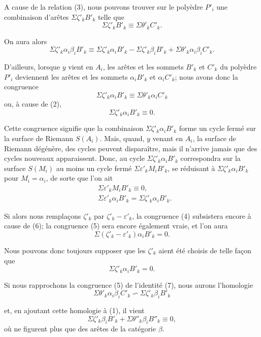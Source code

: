 \documentclass{article}
\begin{document}
A cause de la relation (3), nous pouvons trouver sur le polyèdre $P'_{i}$ une combinaison d'arêtes $\Sigma \zeta'_{k} B'_{k}$ telle que
\[ \Sigma \zeta'_{k} B'_{k} \equiv \Sigma \theta'_{k} C'_{k}. \tag{4} \]


On aura alors
\[ \Sigma \zeta'_{k} \alpha_{i}\beta_{i}B'_{k} \equiv \Sigma \zeta'_{k} \alpha_{i}B'_{k} - \Sigma \zeta'_{k} \beta_{i}B'_{k} + \Sigma \theta'_{k} \alpha_{i}\beta_{i}C'_{k}. \tag{5} \]

D'ailleurs, lorsque $y$ vient en $A_{i}$, les arêtes et les sommets $B'_{k}$ et $C'_{k}$ du polyèdre $P'_{i}$ deviennent les arêtes et les sommets $\alpha_{i}B'_{k}$ et $\alpha_{i}C'_{k}$; nous avons donc la congruence
\[ \Sigma \zeta'_{k} \alpha_{i}B'_{k} \equiv \Sigma \theta'_{k} \alpha_{i}C'_{k} \]
ou, à cause de (2),
\[ \Sigma \zeta'_{k} \alpha_{i}B'_{k} \equiv 0. \]

Cette congruence signifie que la combinaison $\Sigma \zeta'_{k} \alpha_{i}B'_{k}$ forme un cycle fermé sur la surface de Riemann $S(A_{i})$. Mais, quand, $y$ venant en $A_{i}$, la surface de Riemann dégénère, des cycles peuvent disparaître, mais il n'arrive jamais que des cycles nouveaux apparaissent. Donc, au cycle $\Sigma \zeta'_{k} \alpha_{i}B'_{k}$ correspondra sur la surface $S(M_{i})$ au moins un cycle fermé $\Sigma \varepsilon'_{k} M_{i}B'_{k}$, se réduisant à $\Sigma \zeta'_{k} \alpha_{i}B'_{k}$ pour $M_{i} = \alpha_{i}$, de sorte que l'on ait
\[ \begin{aligned} &\Sigma \varepsilon'_{k} M_{i}B'_{k} \equiv 0,\\ &\Sigma \varepsilon'_{k} \alpha_{i}B'_{k} = \Sigma \zeta'_{k} \alpha_{i}B'_{k}. \end{aligned} \tag{6} \]

Si alors nous remplaçons $\zeta'_{k}$ par $\zeta'_{k} - \varepsilon'_{k}$, la congruence (4) subsistera encore à cause de (6); la congruence (5) sera encore également vraie, et l'on aura
\[ \Sigma(\zeta'_{k} - \varepsilon'_{k})\alpha_{i}B'_{k} = 0. \]

Nous pouvons donc toujours supposer que les $\zeta'_{k}$ aient été choisis de telle façon que
\[ \Sigma \zeta'_{k} \alpha_{i}B'_{k} = 0. \tag{7} \]

Si nous rapprochons la congruence (5) de l'identité (7), nous aurons l'homologie
\[ \Sigma \theta'_{k} \alpha_{i}\beta_{i}C'_{k} \backsim \Sigma \zeta'_{k} \beta_{i}B'_{k} \tag{8} \]

et, en ajoutant cette homologie à (1), il vient
\[ \Sigma \zeta'_{k} \beta_{i}B'_{k} + \Sigma \theta''_{k} \beta_{i}B''_{k} \equiv 0, \]
où ne figurent plus que des arêtes de la catégorie $\beta$.
\end{document}
